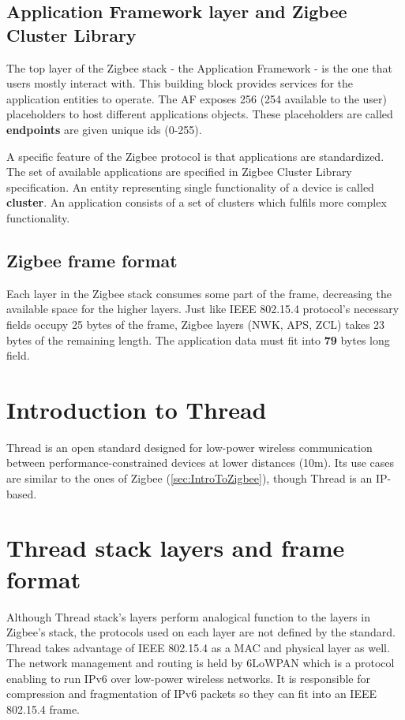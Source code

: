 \subsection*{Application Framework layer and Zigbee Cluster Library}

The top layer of the Zigbee stack - the Application Framework - is the one that users mostly interact 
with. This building block provides services for the application entities to operate. The AF exposes
256 (254 available to the user) placeholders to host different applications objects. These placeholders are called \textbf{endpoints} are given unique ids (0-255).

A specific feature of the Zigbee protocol is that applications are standardized. The set of available 
applications are specified in Zigbee Cluster Library specification. An entity representing single 
functionality of a device is called \textbf{cluster}. An application consists of a set of clusters which fulfils more complex
functionality.\cite{AddingZCLClusters}

\subsection{Zigbee frame format}

Each layer in the Zigbee stack consumes some part of the frame, decreasing the
available space for the higher layers. Just like IEEE 802.15.4 protocol's 
necessary fields occupy 25 bytes of the frame, Zigbee layers (NWK, APS, ZCL) takes
23 bytes of the remaining length. The application data must fit into \textbf{79} 
bytes long field.


\section{Introduction to Thread}

Thread is an open standard designed for low-power wireless communication  
between performance-constrained devices at lower distances (10m). Its use cases are 
similar to the ones of Zigbee (\ref{sec:IntroToZigbee}), though Thread is an
IP-based.

\section{Thread stack layers and frame format}

Although Thread stack's layers perform analogical 
function to the layers in Zigbee's stack, the protocols used on each layer are not defined by the standard.
Thread takes advantage of IEEE 802.15.4 as a MAC and physical layer as well. The network 
management and routing is held by 6LoWPAN which is a protocol enabling to run IPv6
over low-power wireless networks. It is responsible for compression and fragmentation
of IPv6 packets so they can fit into an IEEE 802.15.4 frame\cite{ThreadNordicSemi}.

